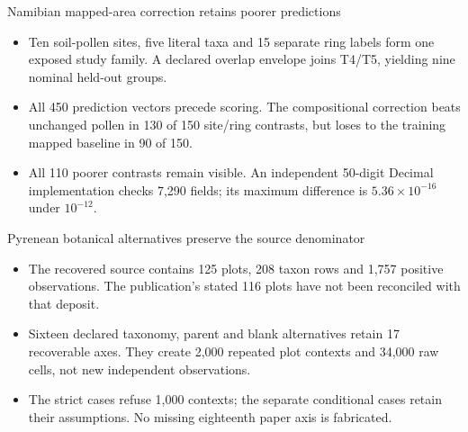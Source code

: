 \begin{frame}{Namibian mapped-area correction retains poorer predictions}
\small
\begin{itemize}
\item Ten soil-pollen sites, five literal taxa and 15 separate ring labels form one exposed study family. A declared overlap envelope joins T4/T5, yielding nine nominal held-out groups.
\item All 450 prediction vectors precede scoring. The compositional correction beats unchanged pollen in 130 of 150 site/ring contrasts, but loses to the training mapped baseline in 90 of 150.
\item All 110 poorer contrasts remain visible. An independent 50-digit Decimal implementation checks 7,290 fields; its maximum difference is $5.36\times10^{-16}$ under $10^{-12}$.
\end{itemize}
\end{frame}

\begin{frame}{Pyrenean botanical alternatives preserve the source denominator}
\small
\begin{itemize}
\item The recovered source contains 125 plots, 208 taxon rows and 1,757 positive observations. The publication's stated 116 plots have not been reconciled with that deposit.
\item Sixteen declared taxonomy, parent and blank alternatives retain 17 recoverable axes. They create 2,000 repeated plot contexts and 34,000 raw cells, not new independent observations.
\item The strict cases refuse 1,000 contexts; the separate conditional cases retain their assumptions. No missing eighteenth paper axis is fabricated.
\end{itemize}
\end{frame}

